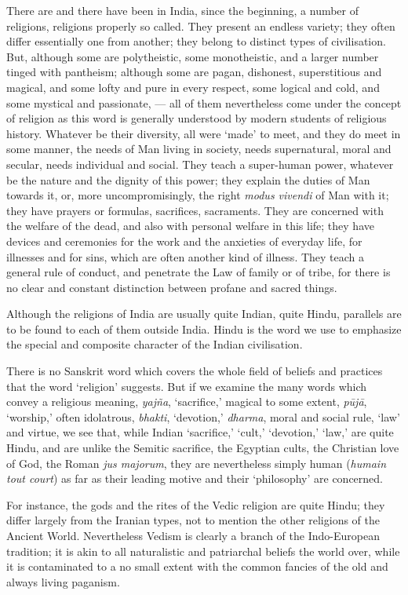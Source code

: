 \documentclass[a4paper, 11pt, oneside, english, landscape]{article}
\begin{document}
There are and there have been in India, since the beginning, a number of religions, religions properly so called. They present an endless variety; they often differ essentially one from another; they belong to distinct types of civilisation. But, although some are polytheistic, some monotheistic, and a larger number tinged with pantheism; although some are pagan, dishonest, superstitious and magical, and some lofty and pure in every respect, some logical and cold, and some mystical and passionate, --- all of them nevertheless come under the concept of religion as this word is generally understood by modern students of religious history. Whatever be their diversity, all were `made' to meet, and they do meet in some manner, the needs of Man living in society, needs supernatural, moral and secular, needs individual and social. They teach a super-human power, whatever be the nature and the dignity of this power; they explain the duties of Man towards it, or, more uncompromisingly, the right \emph{modus vivendi} of Man with it; they have prayers or formulas, sacrifices, sacraments. They are concerned with the welfare of the dead, and also with personal welfare in this life; they have devices and ceremonies for the work and the anxieties of everyday life, for illnesses and for sins, which are often another kind of illness. They teach a general rule of conduct, and penetrate the Law of family or of tribe, for there is no clear and constant distinction between profane and sacred things.

Although the religions of India are usually quite Indian, quite Hindu, parallels are to be found to each of them outside India. Hindu is the word we use to emphasize the special and composite character of the Indian civilisation.

There is no Sanskrit word which covers the whole field of beliefs and practices that the word `religion' suggests. But if we examine the many words which convey a religious meaning, \emph{yajña}, `sacrifice,' magical to some extent, \emph{pūjā}, `worship,' often idolatrous, \emph{bhakti}, `devotion,' \emph{dharma}, moral and social rule, `law' and virtue, we see that, while Indian `sacrifice,' `cult,' `devotion,' `law,' are quite Hindu, and are unlike the Semitic sacrifice, the Egyptian cults, the Christian love of God, the Roman \emph{jus majorum}, they are nevertheless simply human (\emph{humain tout court}) as far as their leading motive and their `philosophy' are concerned.

For instance, the gods and the rites of the Vedic religion are quite Hindu; they differ largely from the Iranian types, not to mention the other religions of the Ancient World. Nevertheless Vedism is clearly a branch of the Indo-European tradition; it is akin to all naturalistic and patriarchal beliefs the world over, while it is contaminated to a no small extent with the common fancies of the old and always living paganism.
\end{document}
